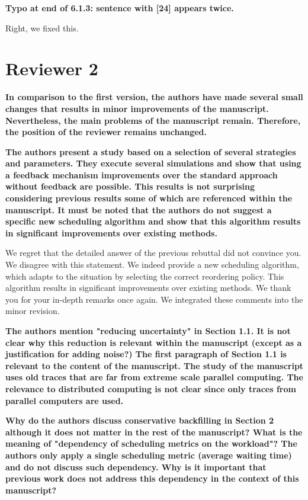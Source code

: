 \documentclass[]{article}
\begin{document}
\textbf{Typo at end of 6.1.3: sentence with [24] appears twice.
}

Right, we fixed this.


\section{Reviewer 2}

\textbf{In comparison to the first version, the authors have made several small changes that results in minor improvements of
the manuscript. Nevertheless, the main problems of the manuscript remain. Therefore, the position of the reviewer
remains unchanged.
}

\textbf{The authors present a study based on a selection of several strategies and parameters. They execute several simulations
and show that using a feedback mechanism improvements over the standard approach without feedback are possible. This
results is not surprising considering previous results some of which are referenced within the manuscript. It must be
noted that the authors do not suggest a specific new scheduling algorithm and show that this algorithm results in
significant improvements over existing methods.
}

We regret that the detailed answer of the previous rebuttal did not convince you. We disagree with this statement. We indeed
provide a new scheduling algorithm, which adapts to the situation by selecting the correct reordering policy. This algorithm
results in significant improvements over existing methods.
We thank you for your in-depth remarks once again. We integrated these comments into the minor revision.

\textbf{The authors mention "reducing uncertainty" in Section 1.1. It is not clear why this reduction is relevant within the
manuscript (except as a justification for adding noise?)
The first paragraph of Section 1.1 is relevant to the content of the manuscript. The study of the manuscript uses old
traces that are far from extreme scale parallel computing. The relevance to distributed computing is not clear since
only traces from parallel computers are used.
}

\textbf{Why do the authors discuss conservative backfilling in Section 2 although it does not matter in the rest of the
manuscript?
What is the meaning of "dependency of scheduling metrics on the workload"? The authors only apply a single scheduling
metric (average waiting time) and do not discuss such dependency. Why is it important that previous work does not
address this dependency in the context of this manuscript?
}
\end{document}
